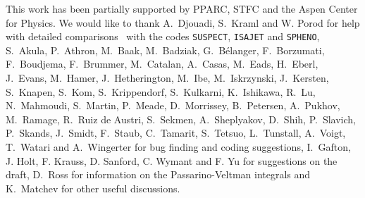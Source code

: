 \documentclass[]{article}
\begin{document}
\acknowledgments
This work has been partially supported by PPARC, STFC and the Aspen Center for
Physics.
We would like to thank
A.~Djouadi, S.~Kraml and W. Porod 
for help with detailed comparisons~\cite{comparison} with the codes
{\tt SUSPECT}, {\tt ISAJET} and {\tt SPHENO},
S.~Akula, P.~Athron, M.~Baak, M.~Badziak, 
G.~B\'elanger, F.~Borzumati, F.~Boudjema, F.~Brummer, M.~Catalan, A.~Casas, 
M.~Eads, H.~Eberl, J.~Evans,
M.~Hamer,
J.~Hetherington, M.~Ibe, M.~Iskrzynski, J.~Kersten, S.~Knapen, S.~Kom,
S.~Krippendorf, S.~Kulkarni, K.~Ishikawa, 
R.~Lu, N.~Mahmoudi,  S.~Martin, P.~Meade,
D.~Morrissey, B.~Petersen,
A.~Pukhov, M.~Ramage,
R.~Ruiz de Austri, 
S.~Sekmen, A.~Sheplyakov, D.~Shih, P.~Slavich, P.~Skands, J.~Smidt, 
F.~Staub, C.~Tamarit, 
S.~Tetsuo, L.~Tunstall, A.~Voigt,
T.~Watari and A.~Wingerter
for bug finding and coding suggestions, I.~Gafton, J. Holt, F. Krauss,
D. Sanford, C. Wymant and F. Yu for
suggestions on the draft, D.~Ross for  
information on the Passarino-Veltman integrals and K.~Matchev for 
other useful discussions. 
\end{document}
